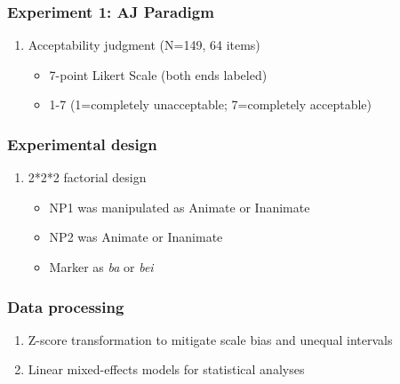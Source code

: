 \documentclass{beamer}
\begin{document}



\begin{frame}
\frametitle{Experiment 1: AJ Paradigm}
\begin{enumerate}
    \pause
    \item Acceptability judgment (N=149, 64 items)
    \pause
    \begin{itemize}
        \pause
        \item 7-point Likert Scale (both ends labeled)
        \item 1-7 (1=completely unacceptable; 7=completely acceptable)
        \pause
    \end{itemize}
\end{enumerate}
\end{frame}



\begin{frame}
\frametitle{Experimental design}
\begin{enumerate}
    \pause
    \item 2*2*2 factorial design
    \pause
    \begin{itemize}
        \pause  
        \item NP1 was manipulated as Animate or Inanimate
        \item NP2 was Animate  or Inanimate
        \item Marker as \emph{ba} or \emph{bei}
        \pause
    \end{itemize}
\end{enumerate}
\end{frame}



\begin{frame}
\frametitle{Data processing}
\begin{enumerate}
    \item Z-score transformation to mitigate scale bias and unequal intervals
        \textbf\centering{\textcolor{blue}{\[ z = (\gamma - \mu)/ \sigma \]}}
    \pause
    \item Linear mixed-effects models for statistical analyses 
\end{enumerate}
\end{frame}
\end{document}
